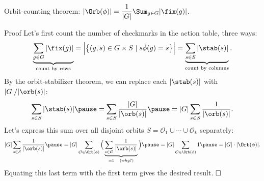 \documentclass[8pt, handout]{beamer}
\newcommand{\Pause}{}      %
\begin{document}

\begin{frame}{Orbit-counting theorem:
    $\displaystyle|\Orb(\phi)|=\frac{1}{|G|}\Sum_{g\in G}|\fix(g)|$.} 
  
  \begin{exampleblock}{Proof} \Pause
    Let's first count the number of checkmarks in the action table, three ways: 
    \[
    \underbrace{\sum_{g\in G}|\fix(g)|}_{\text{count by rows}}\Pause
    =\Big|\big\{(g,s)\in G\times S\mid s\Dot\phi(g)=s\big\}\Big|
    \Pause=\underbrace{\sum_{s\in S}|\stab(s)|}_{\text{count by columns}}.
    \]
    \pause By the orbit-stabilizer theorem, we can replace each
    $|\stab(s)|$ with $|G|/|\orb(s)|$:
    \[
    \sum_{s\in S}|\stab(s)|\pause=\sum_{s\in S}\frac{|G|}{|\orb(s)|}
    \pause=|G|\sum_{s\in S}\frac{1}{|\orb(s)|}.
    \]
    \pause Let's express this sum over all disjoint orbits
    $S=\mathcal{O}_1\cup\cdots\cup\mathcal{O}_k$ separately:
    \[
    |G|\sum_{s\in S}\frac{1}{|\orb(s)|}
    \pause=|G|\sum_{\mathcal{O}\in\Orb(\phi)}\Big(
    \underbrace{\sum_{s\in\mathcal{O}}\frac{1}{|\orb(s)|}}_{=1\quad\text(why?)}\Big)
    \pause=|G|\sum_{\mathcal{O}\in\Orb(\phi)}1\pause=|G|\cdot|\Orb(\phi)|.
    \]
    \pause Equating this last term with the first term gives the desired
    result. $\hfill\Box$    
  \end{exampleblock}
  
\end{frame}

\end{document}
